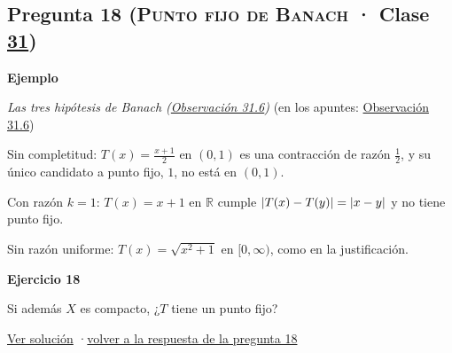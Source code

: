 \documentclass[11pt,a4paper]{article}
\newcommand{\R}{\mathbb{R}}\newcommand{\N}{\mathbb{N}}\newcommand{\Q}{\mathbb{Q}}
\newcommand{\bloque}[1]{\par\smallskip\noindent\textbf{\color{acento}#1}\par}
\begin{document}
\subsection*{\hypertarget{e-18}{}Pregunta 18 \normalfont\small(\textsc{Punto fijo de Banach} · Clase \href{https://decostruttivismo.github.io/MAT2514-repaso/pdf/MAT2514_apuntes_completos.pdf\#nameddest=section.31}{31})}
\bloque{Ejemplo}
\textit{Las tres hipótesis de Banach (\href{https://decostruttivismo.github.io/MAT2514-repaso/pdf/MAT2514_apuntes_completos.pdf\#nameddest=teorema.31.6}{Observación 31.6})} {\small(en los apuntes: \href{https://decostruttivismo.github.io/MAT2514-repaso/pdf/MAT2514_apuntes_completos.pdf\#nameddest=teorema.31.6}{Observación 31.6})}
\begin{pasos}
\item[] Sin completitud: $T(x)=\frac{x+1}2$ en $(0,1)$ es una contracción de razón $\frac12$, y su único candidato a punto fijo, $1$, no está en $(0,1)$.
\item[] Con razón $k=1$: $T(x)=x+1$ en $\R$ cumple $\lvert T(x)-T(y)\rvert=\lvert x-y\rvert$ y no tiene punto fijo.
\item[] Sin razón uniforme: $T(x)=\sqrt{x^2+1}$ en $[0,\infty)$, como en la justificación.
\end{pasos}
\bloque{\hypertarget{x-18}{}Ejercicio 18}
Si además $X$ es compacto, ¿$T$ tiene un punto fijo?
\par{\small \hyperlink{s-18}{Ver solución} \quad·\quad \hyperlink{r-18}{volver a la respuesta de la pregunta 18}}
\end{document}
